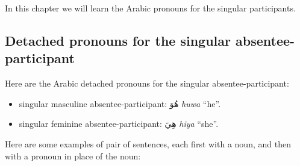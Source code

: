 \documentclass[
  10pt,
]{book}
\providecommand{\tightlist}{%
  \setlength{\itemsep}{0pt}\setlength{\parskip}{0pt}}
\begin{document}
In this chapter we will learn the Arabic pronouns for the singular participants.

\subsection{Detached pronouns for the singular absentee-participant}\label{detached-pronouns-for-the-singular-absentee-participant}

Here are the Arabic detached pronouns for the singular absentee-participant:

\begin{itemize}
\tightlist
\item
  singular masculine absentee-participant: \foreignlanguage{arabic}{هُوَ} \emph{huwa} \enquote{he}.
\item
  singular feminine absentee-participant: \foreignlanguage{arabic}{هِيَ} \emph{hiya} \enquote{she}.
\end{itemize}

Here are some examples of pair of sentences, each first with a noun, and then with a pronoun in place of the noun:
\end{document}
